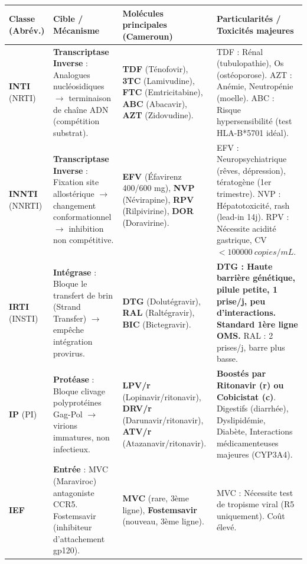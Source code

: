 \documentclass[11pt]{article}
\newcommand{\cle}[1]{{\popxbold\color{popdark}#1}}
\begin{document}
\begin{propriete}
\begin{center}
\begin{tabularx}{\linewidth}{|l|X|X|X|}\hline
\rowcolor{popblueL}
\textbf{Classe (Abrév.)} & \textbf{Cible / Mécanisme} & \textbf{Molécules principales (Cameroun)} & \textbf{Particularités / Toxicités majeures} \\ \hline
\textbf{INTI} (NRTI) & \textbf{Transcriptase Inverse} : Analogues nucléosidiques $\to$ terminaison de chaîne ADN (compétition substrat). & \textbf{TDF} (Ténofovir), \textbf{3TC} (Lamivudine), \textbf{FTC} (Emtricitabine), \textbf{ABC} (Abacavir), \textbf{AZT} (Zidovudine). & TDF : Rénal (tubulopathie), Os (ostéoporose). AZT : Anémie, Neutropénie (moelle). ABC : Risque hypersensibilité (test HLA-B*5701 idéal). \\ \hline
\textbf{INNTI} (NNRTI) & \textbf{Transcriptase Inverse} : Fixation site allostérique $\to$ changement conformationnel $\to$ inhibition non compétitive. & \textbf{EFV} (Éfavirenz 400/600 mg), \textbf{NVP} (Névirapine), \textbf{RPV} (Rilpivirine), \textbf{DOR} (Doravirine). & EFV : Neuropsychiatrique (rêves, dépression), tératogène (1er trimestre). NVP : Hépatotoxicité, rash (lead-in 14j). RPV : Nécessite acidité gastrique, CV $< \SI{100000}{copies/mL}$. \\ \hline
\textbf{IRTI} (INSTI) & \textbf{Intégrase} : Bloque le transfert de brin (Strand Transfer) $\to$ empêche intégration provirus. & \textbf{DTG} (Dolutégravir), \textbf{RAL} (Raltégravir), \textbf{BIC} (Bictegravir). & \textbf{DTG : Haute barrière génétique, pilule petite, 1 prise/j, peu d'interactions. \cle{Standard 1ère ligne OMS}.} RAL : 2 prises/j, barre plus basse. \\ \hline
\textbf{IP} (PI) & \textbf{Protéase} : Bloque clivage polyprotéines Gag-Pol $\to$ virions immatures, non infectieux. & \textbf{LPV/r} (Lopinavir/ritonavir), \textbf{DRV/r} (Darunavir/ritonavir), \textbf{ATV/r} (Atazanavir/ritonavir). & \textbf{Boostés par Ritonavir (r) ou Cobicistat (c)}. Digestifs (diarrhée), Dyslipidémie, Diabète, Interactions médicamenteuses majeures (CYP3A4). \\ \hline
\textbf{IEF} & \textbf{Entrée} : MVC (Maraviroc) antagoniste CCR5. Fostemsavir (inhibiteur d'attachement gp120). & \textbf{MVC} (rare, 3ème ligne), \textbf{Fostemsavir} (nouveau, 3ème ligne). & MVC : Nécessite test de tropisme viral (R5 uniquement). Coût élevé. \\ \hline
\end{tabularx}
\end{center}
\end{propriete}
\end{document}
